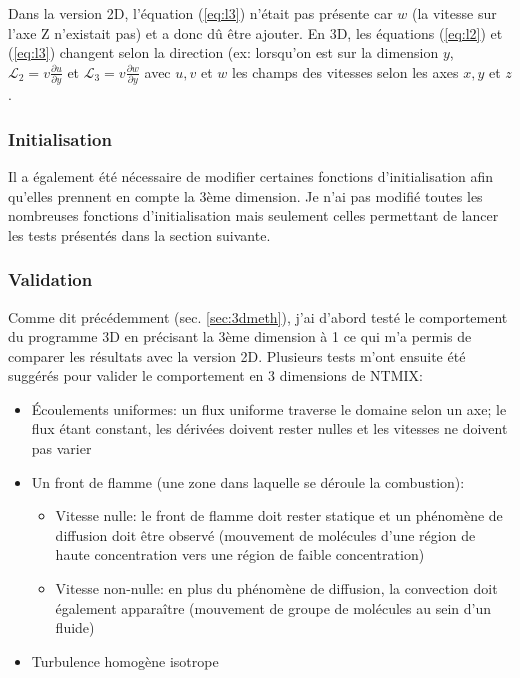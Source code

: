 Dans la version 2D, l'équation (\ref{eq:l3}) n'était pas présente car $w$ (la vitesse sur l'axe Z n'existait pas) et a donc dû être ajouter. En 3D, les équations (\ref{eq:l2}) et (\ref{eq:l3}) changent selon la direction (ex: lorsqu'on est sur la dimension $y$, $\mathcal{L}_2 = v \frac{\partial u}{\partial y}$ et $\mathcal{L}_3 = v \frac{\partial w}{\partial y}$ avec $u,v$ et $w$ les champs des vitesses selon les axes $x,y$ et $z$.

\subsubsection{Initialisation}Il a également été nécessaire de modifier certaines fonctions d'initialisation afin qu'elles prennent en compte la 3ème dimension. Je n'ai pas modifié toutes les nombreuses fonctions d'initialisation mais seulement celles permettant de lancer les tests présentés dans la section suivante.





\subsubsection{Validation}\label{sec:3D-validation}
Comme dit précédemment (sec. \ref{sec:3dmeth}), j'ai d'abord testé le comportement du programme 3D en précisant la 3ème dimension à 1 ce qui m'a permis de comparer les résultats avec la version 2D. Plusieurs tests m'ont ensuite été suggérés pour valider le comportement en 3 dimensions de NTMIX:

\begin{itemize}
\item Écoulements uniformes: un flux uniforme traverse le domaine selon un axe; le flux étant constant, les dérivées doivent rester nulles et les vitesses ne doivent pas varier
\item Un front de flamme (une zone dans laquelle se déroule la combustion):
  \begin{itemize}
  \item Vitesse nulle: le front de flamme doit rester statique et un phénomène de diffusion doit être observé (mouvement de molécules d'une région de haute concentration vers une région de faible concentration)
  \item Vitesse non-nulle: en plus du phénomène de diffusion, la convection doit également apparaître (mouvement de groupe de molécules au sein d'un fluide)
  \end{itemize}
\item Turbulence homogène isotrope
\end{itemize}


